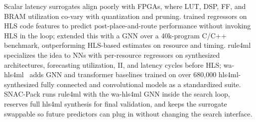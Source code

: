 \documentclass[11pt]{article}
\begin{document}

Scalar latency surrogates align poorly with FPGAs, where LUT, DSP, FF, and BRAM utilization co-vary with quantization and pruning.
\citet{10.1145/3240765.3264635} trained regressors on HLS code features to predict post-place-and-route performance without invoking HLS in the loop; \citet{10.1145/3489517.3530408} extended this with a GNN over a 40k-program C/C++ benchmark, outperforming HLS-based estimates on resource and timing.
rule4ml~\citep{Rahimifar_2025} specializes the idea to NNs with per-resource regressors on synthesized architectures, forecasting utilization, II, and latency cycles before HLS; wa-hls4ml~\citep{hawks2025wahls4mlbenchmarksurrogatemodels} adds GNN and transformer baselines trained on over 680{,}000 hls4ml-synthesized fully connected and convolutional models as a standardized suite.
SNAC-Pack runs rule4ml with the wa-hls4ml GNN inside the search loop, reserves full hls4ml synthesis for final validation, and keeps the surrogate swappable so future predictors can plug in without changing the search interface.
\end{document}
